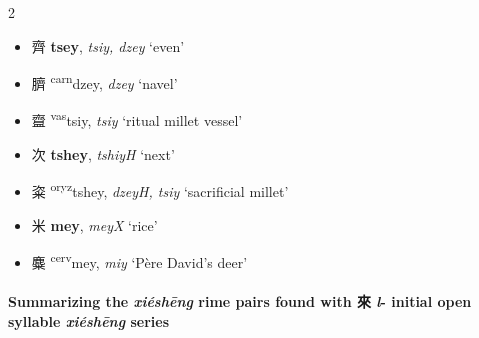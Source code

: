 \begin{multicols}{2}
\raggedcolumns

\begin{itemize}

    \item {\Large{齊}} %
    {\large{\textbf{tsey}}},
    \textit{tsiy, dzey} %
    `even'

    \item {\Large{臍}} %
    {\large{{\textsuperscript{carn}dzey}}},
    \textit{dzey} %
    `navel'

    \item {\Large{齍}} %
    {\large{{\textsuperscript{vas}tsiy}}},
    \textit{tsiy} %
    `ritual millet vessel'

\end{itemize}

\medskip

\begin{minipage}{\columnwidth}
\begin{itemize}[leftmargin=*, labelsep=0.5em]
    \item {\Large{次}} %
    {\large{\textbf{tshey}}},
    \textit{tshiyH} %
    `next'

    \item {\Large{粢}} %
    {\large{{\textsuperscript{oryz}tshey}}},
    \textit{dzeyH, tsiy} %
    `sacrificial millet'

\end{itemize}
\end{minipage}

\medskip

\begin{minipage}{\columnwidth}
\begin{itemize}[leftmargin=*, labelsep=0.5em]

    \item {\Large{米}} %
    {\large{\textbf{mey}}},
    \textit{meyX} %
    `rice'

    \item {\Large{麋}} %
    {\large{{\textsuperscript{cerv}mey}}},
    \textit{miy} %
    `Père David's deer'

\end{itemize}
\end{minipage}
\end{multicols}





\paragraph{Summarizing the \textit{xiéshēng} rime pairs found with  來 \textit{l}- initial open syllable \textit{xiéshēng} series}

